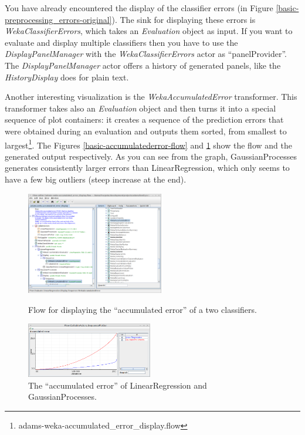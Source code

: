 You have already encountered the display of the classifier errors (in Figure
\ref{basic-preprocessing_errors-original}). The sink for displaying these errors
is \textit{WekaClassifierErrors}, which takes an \textit{Evaluation} object as
input. If you want to evaluate and display multiple classifiers then you have to
use the \textit{DisplayPanelManager} with the \textit{WekaClassifierErrors}
actor as ``panelProvider''. The \textit{DisplayPanelManager} actor offers a
history of generated panels, like the \textit{HistoryDisplay} does for plain
text.

Another interesting visualization is the \textit{WekaAccumulatedError}
transformer. This transformer takes also an \textit{Evaluation} object and then
turns it into a special sequence of plot containers: it creates a sequence of
the prediction errors that were obtained during an evaluation and outputs them
sorted, from smallest to
largest\footnote{adams-weka-accumulated\_error\_display.flow}. The Figures
\ref{basic-accumulatederror-flow} and \ref{basic-accumulatederror-output} show
the flow and the generated output respectively. As you can see from the graph,
GaussianProcesses generates consistently larger errors than LinearRegression,
which only seems to have a few big outliers (steep increase at the end).

\begin{figure}[ht]
  \begin{minipage}[t]{0.5\linewidth}
    \centering
    \includegraphics[width=6.0cm]{images/basic-accumulatederror-flow.png}
    \caption{Flow for displaying the ``accumulated error'' of a two
    classifiers.}
    \label{basic-accumulatederror-flow}
  \end{minipage}
  \hspace{0.5cm}
  \begin{minipage}[t]{0.5\linewidth}
    \centering
    \includegraphics[width=5.5cm]{images/basic-accumulatederror-output.png}
    \caption{The ``accumulated error'' of LinearRegression and
    GaussianProcesses.}
    \label{basic-accumulatederror-output}
  \end{minipage}
\end{figure}

